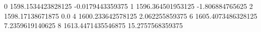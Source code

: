 0 1598.1534423828125 -0.0179443359375
1 1596.364501953125 -1.806884765625
2 1598.17138671875 0.0
4 1600.233642578125 2.062255859375
6 1605.4073486328125 7.2359619140625
8 1613.4471435546875 15.2757568359375
